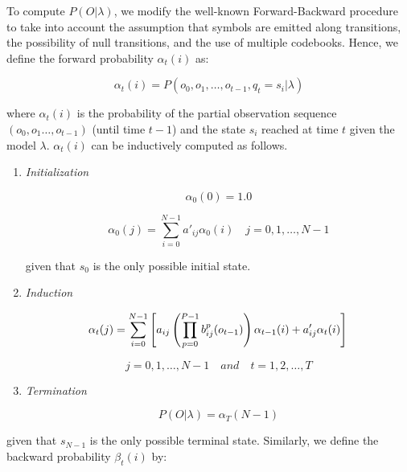 \documentclass{article}[14pt, oneside, a4paper, times]
\begin{document}
To compute $P(O | \lambda)$, we modify the well-known Forward-Backward
procedure \cite{Rabiner89} to take into account the assumption that symbols are
emitted along transitions, the possibility of null transitions, and the use of
multiple codebooks. Hence, we define the forward probability $\alpha_t(i)$ as:

\begin{equation}
    \alpha_t(i) = P(o_0, o_1, \ldots, o_{t-1}, q_t = s_i | \lambda)
    \label{EQ:alpha}
\end{equation}

\noindent where $\alpha_t(i)$ is the probability of the partial observation
sequence $(o_0, o_1 \ldots, o_{t-1})$ (until time $t-1$) and the state $s_i$
reached at time $t$ given the model $\lambda$. $\alpha_t(i)$ can be inductively
computed as follows.

\begin{enumerate}
\item \textit{Initialization}

\begin{equation}
    \alpha_0(0) = 1.0
    \label{EQ:alpha-initialization}
\end{equation}

$$\alpha_{0}(j) = \sum_{i=0}^{N-1} a'_{ij} \alpha_0(i) \quad j = 0, 1, \dots, N-1$$

\noindent given that $s_0$ is the only possible initial state.


\item \textit{Induction}

\begin{equation}
    \alpha_t(j) = \sum_{i=0}^{N-1} \left[ a_{ij} \left( \prod_{p=0}^{P-1} b_{ij}^p(o_{t-1}) \right)
                            \alpha_{t-1}(i) + a'_{ij} \alpha_t(i) \right] \\
    \label{EQ:alpha-induction}
\end{equation}

$$j = 0, 1, \dots, N-1 \quad and \quad t = 1, 2, \dots, T$$


\item \textit{Termination}

\begin{equation}
    P(O|\lambda) = \alpha_T(N-1)
    \label{EQ:alpha-termination}
\end{equation}
\end{enumerate}

\noindent given that $s_{N-1}$ is the only possible terminal state. Similarly,
we define the backward probability $\beta_t(i)$ by:
\end{document}
